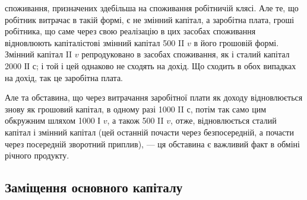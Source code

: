 \parcont{}  %
споживання, призначених здебільша на споживання робітничій клясі.
Але те, що робітник витрачає в такій формі, є не змінний капітал, а
заробітна плата, гроші робітника, що саме через свою реалізацію в цих
засобах споживання відновлюють капіталістові змінний капітал 500 II $v$
в його грошовій формі. Змінний капітал II $v$ репродуковано в засобах
споживання, як і сталий капітал 2000 ІІ $с$; і той і цей однаково не
сходять на дохід. Що сходить в обох випадках на дохід, так це заробітна
плата.

Але та обставина, що через витрачання заробітної плати як доходу
відновлюється знову як грошовий капітал, в одному разі 1000 II $с$,
потім так само цим обкружним шляхом 1000 І $v$, а також 500 II $v$,
отже, відновлюється сталий капітал і змінний капітал (цей останній
почасти через безпосередній, а почасти через посередній зворотний приплив),
— ця обставина є важливий факт в обміні річного продукту.

\subsection{Заміщення основного капіталу}

